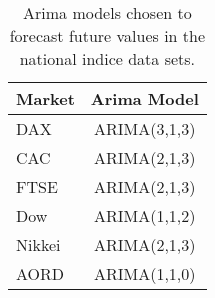 \begin{table}[ht]
\centering
\caption[Arima models chosen for the indice data sets]{Arima models chosen to forecast future values in the national indice data sets.} 
\label{tab:chp_ts_arima_models}
\begin{tabular}{lc}
  \toprule Market & Arima Model \\ 
  \midrule DAX & ARIMA(3,1,3)                    \\ 
  CAC & ARIMA(2,1,3)                    \\ 
  FTSE & ARIMA(2,1,3)                    \\ 
  Dow & ARIMA(1,1,2)                    \\ 
  Nikkei & ARIMA(2,1,3)                    \\ 
  AORD & ARIMA(1,1,0)                    \\ 
   \bottomrule \end{tabular}
\end{table}
